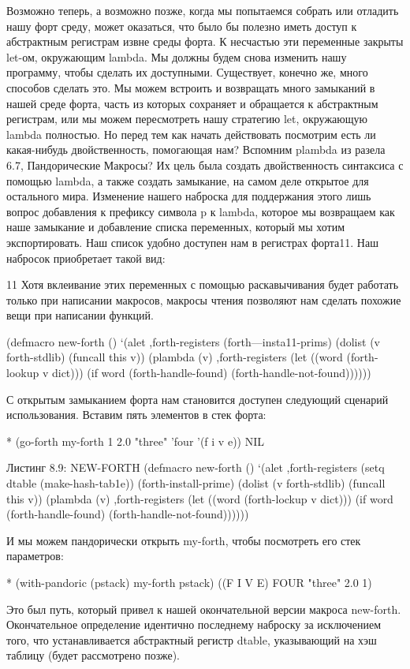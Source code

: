 Возможно теперь, а возможно позже, когда мы попытаемся собрать или отладить нашу форт среду, может оказаться, что было бы полезно иметь доступ к абстрактным регистрам извне среды форта. К несчастью эти переменные закрыты let-ом, окружающим lambda. Мы должны будем снова изменить нашу программу, чтобы сделать их доступными. Существует, конечно же, много способов сделать это. Мы можем встроить и возвращать много замыканий в нашей среде форта, часть из которых сохраняет и обращается к абстрактным регистрам, или мы можем пересмотреть нашу стратегию let, окружающую lambda полностью. Но перед тем как начать действовать посмотрим есть ли какая-нибудь двойственность, помогающая нам? Вспомним plambda из разела 6.7, Пандорические Макросы? Их цель была создать двойственность синтаксиса с помощью lambda, а также создать замыкание, на самом деле открытое для остального мира. Изменение нашего наброска для поддержания этого лишь вопрос добавления к префиксу символа p к lambda, которое мы возвращаем как наше замыкание и добавление списка переменных, который мы хотим экспортировать. Наш список удобно доступен нам в регистрах форта11. Наш набросок приобретает такой вид:

11 Хотя вклеивание этих переменных с помощью раскавычивания будет работать только при написании макросов, макросы чтения позволяют нам сделать похожие вещи при написании функций.

(defmacro new-forth ()
‘(alet ,forth-registers
(forth—insta11-prims)
(dolist (v forth-stdlib)
(funcall this v))
(plambda (v) ,forth-registers
(let ((word (forth-lookup v dict)))
(if word
(forth-handle-found)
(forth-handle-not-found))))))

С открытым замыканием форта нам становится доступен следующий сценарий использования. Вставим пять элементов в стек форта:

* (go-forth my-forth
1 2.0 "three" ’four ’(f i v e))
NIL

Листинг 8.9: NEW-FORTH
(defmacro new-forth ()
‘(alet ,forth-registers
(setq dtable (make-hash-tab1e))
(forth-install-prime)
(dolist (v forth-stdlib)
(funcall this v))
(plambda (v) ,forth-registers
(let ((word (forth-lockup v dict)))
(if word
(forth-handle-found)
(forth-handle-not-found))))))

И мы можем пандорически открыть my-forth, чтобы посмотреть его стек параметров:

* (with-pandoric (pstack) my-forth
pstack)
((F I V E) FOUR "three" 2.0 1)

Это был путь, который привел к нашей окончательной версии макроса new-forth. Окончательное определение идентично последнему наброску за исключением того, что устанавливается абстрактный регистр dtable, указывающий на хэш таблицу (будет рассмотрено позже).

